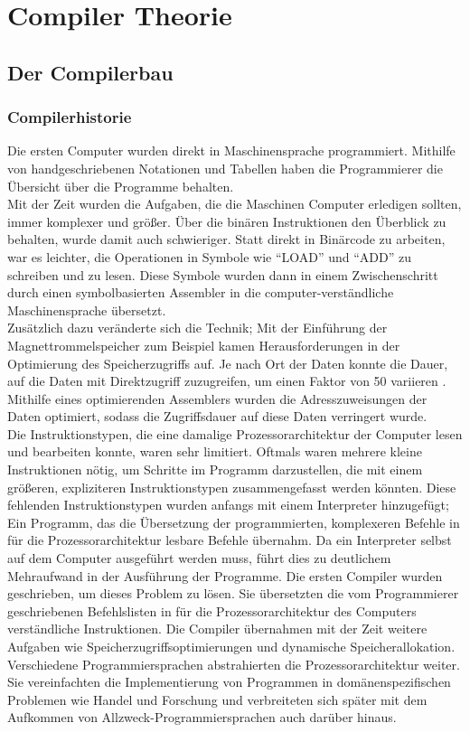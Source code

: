 \part{Compiler Theorie}
\chapter{Der Compilerbau}
\label{chap:theory:compilerHistory}

\section{Compilerhistorie}

Die ersten Computer wurden direkt in Maschinensprache programmiert.
Mithilfe von handgeschriebenen Notationen und Tabellen haben die Programmierer die Übersicht über
die Programme behalten.\\
Mit der Zeit wurden die Aufgaben, die die Maschinen Computer erledigen sollten, immer komplexer und größer.
Über die binären Instruktionen den Überblick zu behalten, wurde damit auch schwieriger.
Statt direkt in Binärcode zu arbeiten, war es leichter, die Operationen in Symbole wie ``LOAD'' und ``ADD'' zu schreiben und zu lesen.
Diese Symbole wurden dann in einem Zwischenschritt durch einen symbolbasierten Assembler in die computer-verständliche Maschinensprache übersetzt.\\
Zusätzlich dazu veränderte sich die Technik; 
Mit der Einführung der Magnettrommelspeicher zum Beispiel kamen Herausforderungen in der Optimierung des Speicherzugriffs auf.
Je nach Ort der Daten konnte die Dauer, auf die Daten mit Direktzugriff zuzugreifen, um einen Faktor von 50 variieren \cite{calingaert:1979}.
Mithilfe eines optimierenden Assemblers wurden die Adresszuweisungen der Daten optimiert, sodass die Zugriffsdauer auf diese Daten verringert wurde.\\
Die Instruktionstypen, die eine damalige Prozessorarchitektur der Computer lesen und bearbeiten konnte, waren sehr limitiert.
Oftmals waren mehrere kleine Instruktionen nötig, um Schritte im Programm darzustellen, die mit einem größeren, expliziteren Instruktionstypen
zusammengefasst werden könnten.
Diese fehlenden Instruktionstypen wurden anfangs mit einem Interpreter hinzugefügt; Ein Programm, das die Übersetzung der programmierten, komplexeren Befehle
in für die Prozessorarchitektur lesbare Befehle übernahm.
Da ein Interpreter selbst auf dem Computer ausgeführt werden muss, führt dies zu deutlichem Mehraufwand in der Ausführung der Programme.
Die ersten Compiler wurden geschrieben, um dieses Problem zu lösen.
Sie übersetzten die vom Programmierer geschriebenen Befehlslisten in für die Prozessorarchitektur des Computers verständliche Instruktionen.
Die Compiler übernahmen mit der Zeit weitere Aufgaben wie Speicherzugriffsoptimierungen und dynamische Speicherallokation.
Verschiedene Programmiersprachen abstrahierten die Prozessorarchitektur weiter.
Sie vereinfachten die Implementierung von Programmen in domänenspezifischen Problemen wie Handel und Forschung und verbreiteten sich später mit dem Aufkommen von Allzweck-Programmiersprachen auch darüber hinaus\cite{calingaert:1979}.

